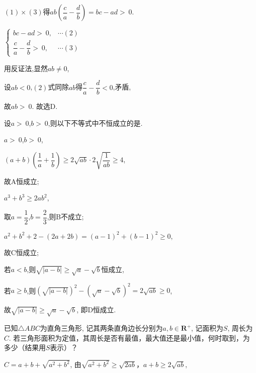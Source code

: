 \documentclass[cs4size,windows,a4paper,answers]{BHCexam}
\begin{document}
\begin{groups}
\begin{questions}[]
\begin{solution}
$(1)\times{}(3)$得$ab(\dfrac{c}{a}-\dfrac{d}{b})=bc-ad\gt\ 0$.

$\begin{cases}bc-ad\gt\ 0,&\cdots(2)\\
\dfrac{c}{a}-\dfrac{d}{b}\gt\ 0,&\cdots(3)
\end{cases}$

用反证法,显然$ab\neq{}0$,

设$ab\lt 0$,$(2)$式同除$ab$得$\dfrac{c}{a}-\dfrac{d}{b}\lt 0$,矛盾,

故$ab\gt\ 0$.
故选D.




\end{solution}
\question[5] 设$a\gt\ 0$,$b\gt\ 0$,则以下不等式中不恒成立的是.

\begin{solution}
\methodonly
$a\gt\ 0$,$b\gt\ 0$,

$(a+b)(\dfrac{1}{a}+\dfrac{1}{b})\geqslant{}2\sqrt{ab}\cdot{}2\sqrt{\dfrac{1}{ab}}\geqslant{}4$,

故A恒成立;

$a^{3}+b^{3}\geqslant{}2ab^{2}$,

取$a=\dfrac{1}{2}$,$b=\dfrac{2}{3}$,则B不成立;

$a^{2}+b^{2}+2-(2a+2b)=(a-1)^{2}+(b-1)^{2}\geqslant{}0$,

故C恒成立;

若$a\lt b$,则$\sqrt{|{a-b}|}\geqslant{}\sqrt{a}-\sqrt{b}$恒成立,

若$a\geqslant{}b$,则${(\sqrt{|{a-b}|})^2}-{(\sqrt{a}-\sqrt{b})^2}=2\sqrt{ab}\geqslant{}0$,

故$\sqrt{|{a-b}|}\geqslant{}\sqrt{a}-\sqrt{b}$,
即D恒成立.




\end{solution}
\end{questions}
\begin{questions}[s]
\question[14] 已知$\triangle ABC$为直角三角形, 记其两条直角边长分别为$a,b\in\mathbf{R}^+$, 记面积为$S$, 周长为$C$. 若三角形面积为定值，其周长是否有最值，最大值还是最小值，何时取到，为多少（结果用$S$表示）？
\begin{solution}
\methodonly
$C=a+b+\sqrt{a^2+b^2}$,
由$\sqrt{a^2+b^2} \ge \sqrt{2ab}$，$a+b \ge 2\sqrt{ab}$,


\end{solution}
\end{questions}
\end{groups}
\end{document}
